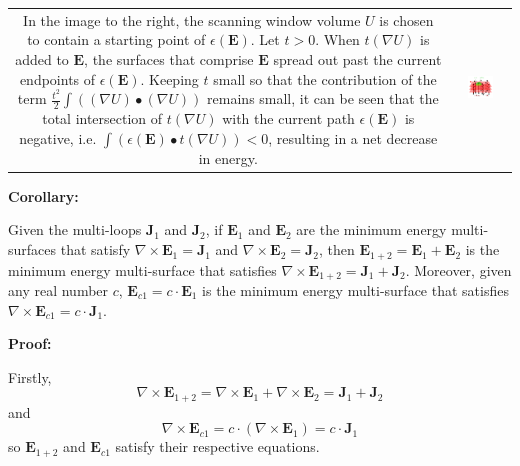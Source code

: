 \begin{tabular}{cc}
\parbox{0.5\textwidth}{
In the image to the right, the scanning window volume \(U\) is chosen to contain a starting point of \(\epsilon(\mathbf{E})\). Let \(t > 0\). When \(t(\nabla U)\) is added to \(\mathbf{E}\), the surfaces that comprise \(\mathbf{E}\) spread out past the current endpoints of \(\epsilon(\mathbf{E})\). Keeping \(t\) small so that the contribution of the term \(\frac{t^2}{2}\int ((\nabla U) \bullet (\nabla U))\) remains small, it can be seen that the total intersection of \(t(\nabla U)\) with the current path \(\epsilon(\mathbf{E})\) is negative, i.e. \(\int (\epsilon(\mathbf{E}) \bullet t(\nabla U)) < 0\), resulting in a net decrease in energy.
} & \parbox{0.5\textwidth}{
\includegraphics[width = 0.5\textwidth]{Duality/minimizing_surface_energy}
}
\end{tabular}

\textbf{Corollary:}

Given the multi-loops \(\mathbf{J}_1\) and \(\mathbf{J}_2\), if \(\mathbf{E}_1\) and \(\mathbf{E}_2\) are the minimum energy multi-surfaces that satisfy \(\nabla \times \mathbf{E}_1 = \mathbf{J}_1\) and \(\nabla \times \mathbf{E}_2 = \mathbf{J}_2\), then \(\mathbf{E}_{1+2} = \mathbf{E}_1 + \mathbf{E}_2\) is the minimum energy multi-surface that satisfies \(\nabla \times \mathbf{E}_{1+2} = \mathbf{J}_1 + \mathbf{J}_2\). Moreover, given any real number \(c\), \(\mathbf{E}_{c1} = c \cdot \mathbf{E}_1\) is the minimum energy multi-surface that satisfies \(\nabla \times \mathbf{E}_{c1} = c \cdot \mathbf{J}_1\).

\textbf{Proof:}

Firstly, 
\[\nabla \times \mathbf{E}_{1+2} = \nabla \times \mathbf{E}_1 + \nabla \times \mathbf{E}_2 = \mathbf{J}_1 + \mathbf{J}_2\]
and
\[\nabla \times \mathbf{E}_{c1} = c \cdot (\nabla \times \mathbf{E}_1) = c \cdot \mathbf{J}_1\]
so \(\mathbf{E}_{1+2}\) and \(\mathbf{E}_{c1}\) satisfy their respective equations.

